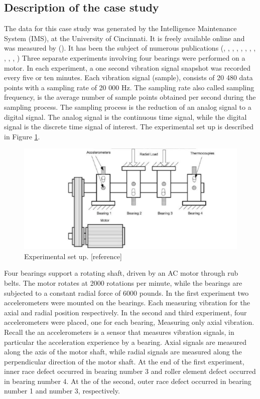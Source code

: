 \documentclass[../Main/thesis.tex]{subfiles}
\begin{document}
\subsection{Description of the case study}
\label{sec:case}
The data for this case study was generated by the Intelligence Maintenance System (IMS), at the University of Cincinnati. It is freely available online and was measured by (\cite{lee2007}). It has been the subject of numerous publications
(\cite{hai2006}, \cite{mejia2010}, \cite{fangtao2011}, \cite{mejia2011}, \cite{mortada2011}, \cite{rego2011}, \cite{yacout2012}, \cite{sergey2012} , \cite{of2012}, \cite{jianbo2012a}, \cite{jianbo2012b}, \cite{mejia2012} )
\justify
Three separate experiments involving four bearings were performed on a motor. In each experiment, a one second vibration signal snapshot was recorded every five or ten minutes. Each vibration signal (sample), consists of 20 480 data points with a sampling rate of 20 000 Hz.
The sampling rate also called sampling frequency, is the average number of sample points obtained per second during the sampling process. The sampling process is the reduction of an analog signal to a digital signal. The analog signal is the continuous time signal, while the digital signal is the discrete time signal of interest. The experimental set up is described in Figure \ref{fig:exp}.
\begin{figure}[H] %
   \centering
   \includegraphics[width=7in]{../fig/experiment} 
   \caption{Experimental set up. [reference]}
   \label{fig:exp}
\end{figure}
\justify
Four bearings support a rotating shaft, driven by an AC motor through rub belts. The motor rotates at 2000 rotations per minute, while the bearings are subjected to a constant radial force of 6000 pounds. In the first experiment two accelerometers were mounted on the bearings. Each measuring vibration for the axial and radial position respectively.
In the second and third experiment, four accelerometers were placed, one for each bearing, Measuring only axial vibration.
Recall the an accelerometers is a sensor that measures vibration signals, in particular the acceleration experience by a bearing. Axial signals are measured along the axis of the motor shaft, while radial signals are measured along the perpendicular direction of the motor shaft.
\justify
At the end of the first experiment, inner race defect occurred in bearing number 3 and roller element defect occurred in bearing number 4. At the of the second, outer race defect occurred in bearing number 1 and number 3, respectively. 
\end{document}
